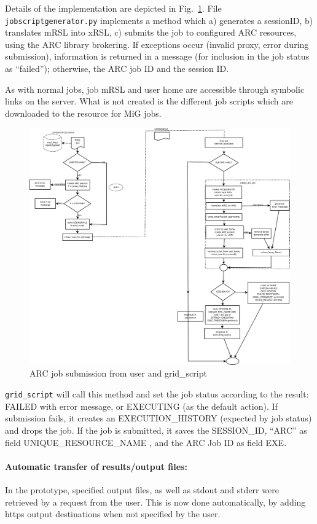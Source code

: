 \documentclass[11pt]{article}
\begin{document}
Details of the implementation are depicted in Fig.~\ref{ARCsubmit}.
File \verb!jobscriptgenerator.py! implements
a method which a) generates a sessionID, b) translates mRSL into xRSL,
c) submits the job to configured ARC resources, using the ARC library
brokering. If exceptions occur (invalid proxy, error during
submission), information is returned in a message (for inclusion in 
the job status as ``failed''); otherwise, the ARC job ID and the 
session ID.

As with normal jobs, job mRSL and user home are accessible through
symbolic links on the server. What is not created is the different job
scripts which are downloaded to the resource for MiG jobs.

\begin{figure}[t!]
\includegraphics[height=0.6\textheight]{ARCsubmit}
\caption{ARC job submission from user and grid\_script}
\label{ARCsubmit}
\end{figure}

\verb!grid_script! will call this method and set the job status
according to the result: FAILED with error message, or EXECUTING (as
the default action). If submission fails, it creates an
EXECUTION\_HISTORY (expected by job status) and drops the job. If the
job is submitted, it saves the SESSION\_ID, ``ARC'' as field
UNIQUE\_RESOURCE\_NAME , and the ARC Job ID as field EXE.

\paragraph{Automatic transfer of results/output files:}
 In the prototype, specified output files, as well as stdout and
 stderr were retrieved by a request from the user. This is now
 done automatically, by adding https output destinations when not
 specified by the user. 
\end{document}
